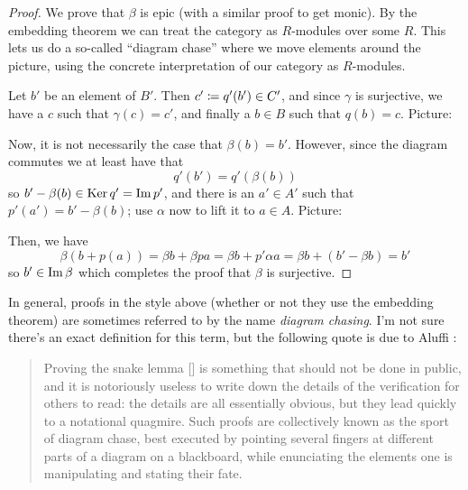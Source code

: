 \begin{proof}
	We prove that $\beta$ is epic (with a similar proof to get monic).
	By the embedding theorem we can treat the category as $R$-modules over some $R$.
	This lets us do a so-called ``diagram chase'' where we move elements around the picture,
	using the concrete interpretation of our category as $R$-modules.

	Let $b'$ be an element of $B'$.
	Then $c' \coloneqq q'(b') \in C'$, and since $\gamma$ is surjective, we have a $c$ such that $\gamma(c) = c'$,
	and finally a $b \in B$ such that $q(b) = c$.
	Picture:
	\begin{center}
	\end{center}
	Now, it is not necessarily the case that $\beta(b) = b'$.
	However, since the diagram commutes we at least have that
	\[ q'(b') = q'(\beta(b)) \]
	so $b' - \beta(b) \in \operatorname{Ker} q' = \operatorname{Im} p'$, and there is an $a' \in A'$ such that
	$p'(a') = b' - \beta(b)$;
	use $\alpha$ now to lift it to $a \in A$.
	Picture:
	\begin{center}
	\end{center}
	Then, we have
	\[
		\beta(b + p(a)) = \beta b + \beta p a
		= \beta b + p' \alpha a
		= \beta b + (b' - \beta b)
		= b'
	\]
	so $b' \in \operatorname{Im} \beta$ which completes the proof that $\beta$ is surjective.
\end{proof}

In general, proofs in the style above (whether or not they use the embedding theorem)
are sometimes referred to by the name \emph{diagram chasing}.
I'm not sure there's an exact definition for this term,
but the following quote is due to Aluffi \cite{ref:aluffi}:
\begin{quote}
	Proving the snake lemma []
	is something that should not be done in public,
	and it is notoriously useless to write down the
	details of the verification for others to read:
	the details are all essentially obvious,
	but they lead quickly to a notational quagmire.
	Such proofs are collectively known as the sport of diagram chase,
	best executed by pointing several fingers at different parts of a diagram on a blackboard,
	while enunciating the elements one is manipulating and stating their fate.
\end{quote}

